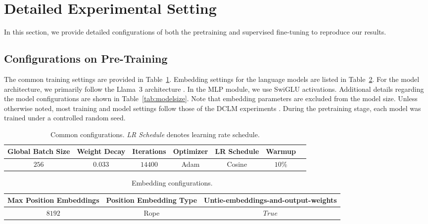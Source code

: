 \newpage

\section{Detailed Experimental Setting} \label{appendix:exp_settings}
In this section, we provide detailed configurations of both the pretraining and supervised fine-tuning to reproduce our results.
\subsection{Configurations on Pre-Training}
The common training settings are provided in Table~\ref{tab:trainingconfigurations}. Embedding settings for the language models are listed in Table~\ref{tab:embedding config}. For the model architecture, we primarily follow the Llama~$3$ architecture \citep{llama3}. In the MLP module, we use SwiGLU activations. Additional details regarding the model configurations are shown in Table~\ref{tab:modelsize}. Note that embedding parameters are excluded from the model size. Unless otherwise noted, most training and model settings follow those of the DCLM experiments \citep{dclm}. During the pretraining stage, each model was trained under a controlled random seed.

\begin{table}[ht]
    \centering
    \caption{Common configurations. \textit{LR Schedule} denotes learning rate schedule. }
    \label{tab:trainingconfigurations}
    \begin{tabular}{ccccccc}
    \toprule
        Global Batch Size  &  Weight Decay & Iterations & Optimizer & LR Schedule & Warmup\\
    \toprule
        $256$ & $0.033$ & $14400$ & Adam & Cosine & $10$\% \\ 
        \bottomrule
    \end{tabular}
\end{table}

\begin{table}[ht]
    \centering
    \caption{Embedding configurations.}
    \label{tab:embedding config}
    \begin{tabular}{ccc}
    \toprule
        Max Position Embeddings  &  Position Embedding Type & Untie-embeddings-and-output-weights\\
    \toprule
        $8192$ & Rope & $True$ \\ 
        \bottomrule
    \end{tabular}
\end{table}

